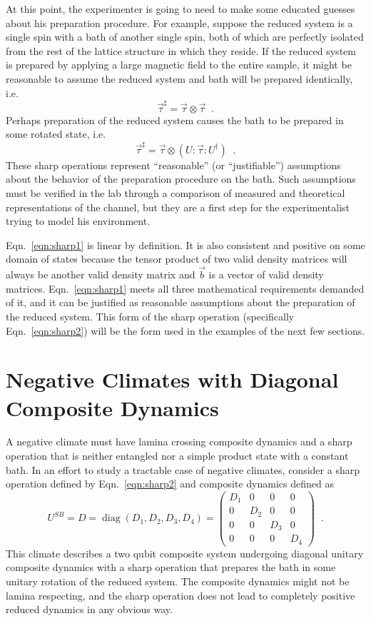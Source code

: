 At this point, the experimenter is going to need to make some educated guesses about his preparation procedure.  For example, suppose the reduced system is a single spin with a bath of another single spin, both of which are perfectly isolated from the rest of the lattice structure in which they reside.  If the reduced system is prepared by applying a large magnetic field to the entire sample, it might be reasonable to assume the reduced system and bath will be prepared identically, i.e.\
$$
\vec{\tau}^\sharp = \vec{\tau}\otimes\vec{\tau}\;\;.
$$
Perhaps preparation of the reduced system causes the bath to be prepared in some rotated state, i.e.\
\begin{equation}
\label{eqn:sharp2}
\vec{\tau}^\sharp = \vec{\tau}\otimes \left(U:\vec{\tau}:U^\dagger\right)\;\;.
\end{equation}
These sharp operations represent ``reasonable'' (or ``justifiable'') assumptions about the behavior of the preparation procedure on the bath.  Such assumptions must be verified in the lab through a comparison of measured and theoretical representations of the channel, but they are a first step for the experimentalist trying to model his environment.

Eqn.\ \ref{eqn:sharp1} is linear by definition.  It is also consistent and positive on some domain of states because the tensor product of two valid density matrices will always be another valid density matrix and $\vec{b}$ is a vector of valid density matrices.  Eqn.\ \ref{eqn:sharp1} meets all three mathematical requirements demanded of it, and it can be justified as reasonable assumptions about the preparation of the reduced system.  This form of the sharp operation (specifically Eqn.\ \ref{eqn:sharp2}) will be the form used in the examples of the next few sections.  

\section{Negative Climates with Diagonal Composite Dynamics}
\label{sec:negclimate}

A negative climate must have lamina crossing composite dynamics and a sharp operation that is neither entangled nor a simple product state with a constant bath.  In an effort to study a tractable case of negative climates, consider a sharp operation defined by Eqn.\ \ref{eqn:sharp2} and composite dynamics defined as
$$
U^{SB} = D = \operatorname{diag}\left(D_1,D_2,D_3,D_4\right) = \begin{pmatrix}
D_1&0&0&0\\
0&D_2&0&0\\
0&0&D_3&0\\
0&0&0&D_4
\end{pmatrix}\;\;.
$$
This climate describes a two qubit composite system undergoing diagonal unitary composite dynamics with a sharp operation that prepares the bath in some unitary rotation of the reduced system.  The composite dynamics might not be lamina respecting, and the sharp operation does not lead to completely positive reduced dynamics in any obvious way.  

